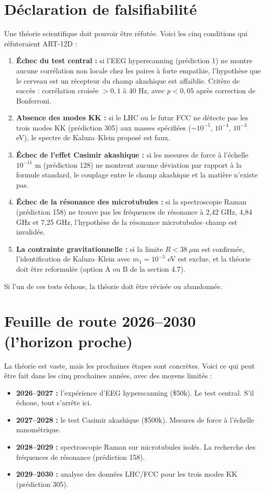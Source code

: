 \section{Déclaration de falsifiabilité}
Une théorie scientifique doit pouvoir être réfutée. Voici les cinq conditions qui réfuteraient ART-12D :
\begin{enumerate}
    \item \textbf{Échec du test central :} si l'EEG hyperscanning (prédiction 1) ne montre aucune corrélation non locale chez les paires à forte empathie, l'hypothèse que le cerveau est un récepteur du champ akashique est affaiblie. Critère de succès : corrélation croisée $> 0,1$ à 40 Hz, avec $p < 0,05$ après correction de Bonferroni.
    \item \textbf{Absence des modes KK :} si le LHC ou le futur FCC ne détecte pas les trois modes KK (prédiction 305) aux masses spécifiées ($\sim 10^{-5}$, $10^{-4}$, $10^{-3}$ eV), le spectre de Kaluza--Klein proposé est faux.
    \item \textbf{Échec de l'effet Casimir akashique :} si les mesures de force à l'échelle $10^{-11}$ m (prédiction 128) ne montrent aucune déviation par rapport à la formule standard, le couplage entre le champ akashique et la matière n'existe pas.
    \item \textbf{Échec de la résonance des microtubules :} si la spectroscopie Raman (prédiction 158) ne trouve pas les fréquences de résonance à 2,42 GHz, 4,84 GHz et 7,25 GHz, l'hypothèse de la résonance microtubules--champ est invalidée.
    \item \textbf{La contrainte gravitationnelle :} si la limite $R < 38\ \mu$m est confirmée, l'identification de Kaluza--Klein avec $m_1 = 10^{-5}$ eV est exclue, et la théorie doit être reformulée (option A ou B de la section 4.7).
\end{enumerate}
Si l'un de ces tests échoue, la théorie doit être révisée ou abandonnée.

\section{Feuille de route 2026--2030 (l'horizon proche)}
La théorie est vaste, mais les prochaines étapes sont concrètes. Voici ce qui peut être fait dans les cinq prochaines années, avec des moyens limités :
\begin{itemize}
    \item \textbf{2026--2027 :} l'expérience d'EEG hyperscanning (\$50k). Le test central. S'il échoue, tout s'arrête ici.
    \item \textbf{2027--2028 :} le test Casimir akashique (\$500k). Mesures de force à l'échelle nanométrique.
    \item \textbf{2028--2029 :} spectroscopie Raman sur microtubules isolés. La recherche des fréquences de résonance (prédiction 158).
    \item \textbf{2029--2030 :} analyse des données LHC/FCC pour les trois modes KK (prédiction 305).
\end{itemize}

\newpage
